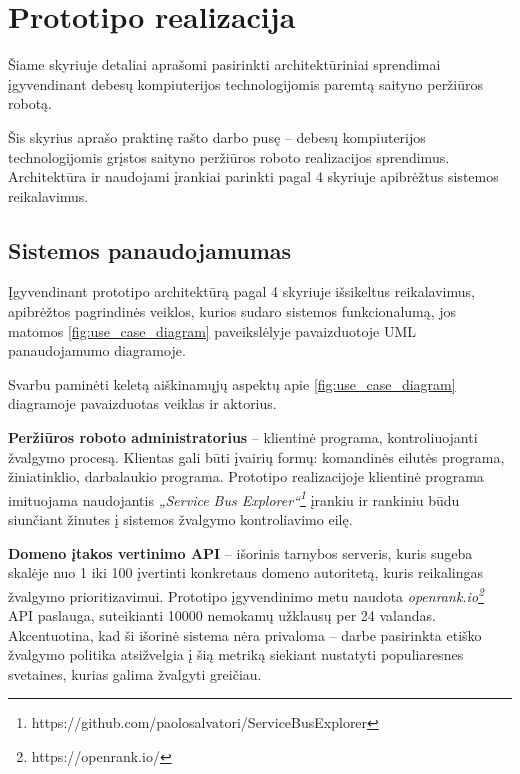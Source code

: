 \section{Prototipo realizacija}

Šiame skyriuje detaliai aprašomi pasirinkti architektūriniai sprendimai įgyvendinant debesų kompiuterijos technologijomis paremtą saityno peržiūros robotą.



Šis skyrius aprašo praktinę rašto darbo pusę -- debesų kompiuterijos technologijomis grįstos saityno peržiūros roboto realizacijos sprendimus. Architektūra ir naudojami įrankiai parinkti pagal 4 skyriuje apibrėžtus sistemos reikalavimus.

\subsection{Sistemos panaudojamumas}

Įgyvendinant prototipo architektūrą pagal 4 skyriuje išsikeltus reikalavimus, apibrėžtos pagrindinės veiklos, kurios sudaro sistemos funkcionalumą, jos matomos \ref{fig:use_case_diagram} paveikslėlyje pavaizduotoje UML panaudojamumo diagramoje.



Svarbu paminėti keletą aiškinamųjų aspektų apie \ref{fig:use_case_diagram} diagramoje pavaizduotas veiklas ir aktorius.


\textbf{Peržiūros roboto administratorius} -- klientinė programa, kontroliuojanti žvalgymo procesą. Klientas gali būti įvairių formų: komandinės eilutės programa, žiniatinklio, darbalaukio programa. Prototipo realizacijoje klientinė programa imituojama naudojantis \textit{„Service Bus Explorer“\footnote{https://github.com/paolosalvatori/ServiceBusExplorer}} įrankiu ir rankiniu būdu siunčiant žinutes į sistemos žvalgymo kontroliavimo eilę.

\textbf{Domeno įtakos vertinimo API} -- išorinis tarnybos serveris, kuris sugeba skalėje nuo 1 iki 100 įvertinti konkretaus domeno autoritetą, kuris reikalingas žvalgymo prioritizavimui. Prototipo įgyvendinimo metu naudota \textit{openrank.io\footnote{https://openrank.io/}} API paslauga, suteikianti 10000 nemokamų užklausų per 24 valandas. Akcentuotina, kad ši išorinė sistema nėra privaloma -- darbe pasirinkta etiško žvalgymo politika atsižvelgia į šią metriką siekiant nustatyti populiaresnes svetaines, kurias galima žvalgyti greičiau.

